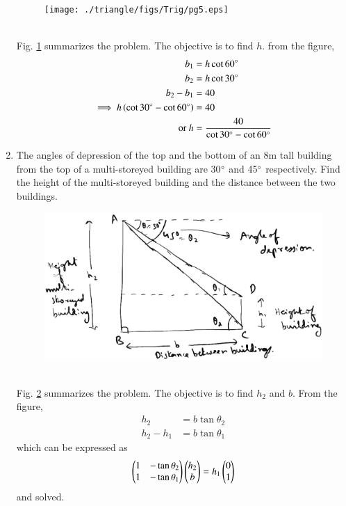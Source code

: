 \begin{enumerate}[label=\arabic*.,ref=\thesubsection.\theenumi]
%
\begin{figure}[!ht]
\texttt{[image: ./triangle/figs/Trig/pg5.eps]}
\caption{}
\label{fig:trig_pg5}
\end{figure}
%
\\
\solution Fig. \ref{fig:trig_pg5} summarizes the problem. The objective is to find $h$.  from the figure,
%
\begin{align}
b_1 &= h\cot 60\degree
\\
b_2 &= h\cot 30\degree
\\
b_2-b_1 &= 40
\\
\implies h \left(\cot 30\degree-\cot 60\degree\right)&= 40
\\
\text{or } h &= \frac{40}{\cot 30\degree-\cot 60\degree}
\end{align}
%
\item The angles of depression of the top and the bottom of an 8m tall building from the top of a multi-storeyed building are 30$\degree$ and 45$\degree$ respectively.  Find the height of the multi-storeyed building and the distance between the two buildings.
%
\begin{figure}[!ht]
\includegraphics[width=\columnwidth]{./triangle/figs/Trig/pg6.eps}
\caption{}
\label{fig:trig_pg6}
\end{figure}
%
\\
\solution Fig. \ref{fig:trig_pg6} summarizes the problem. The objective is to find $h_2$ and $b$.  From the figure, 
%
\begin{align}
h_2 &= b\tan \theta_2
\\
h_2-h_1 &= b\tan \theta_1
\end{align}
%
which can be expressed as
%
\begin{align}
\begin{pmatrix}
 1 & -\tan\theta_2 
\\
 1 & -\tan\theta_1
\end{pmatrix}\begin{pmatrix}h_2\\b\end{pmatrix}
= h_1\begin{pmatrix}0\\1\end{pmatrix}
\end{align}
%
and solved.
%
\end{enumerate}
%
